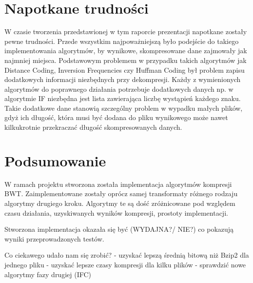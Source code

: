 
\section{Napotkane trudności}

W czasie tworzenia przedstawionej w tym raporcie prezentacji napotkane zostały pewne trudności. Przede wszystkim najpoważniejszą było podejście do takiego implementowania algorytmów, by wynikowe, skompresowane dane zajmowały jak najmniej miejsca. Podstawowym problemem w przypadku takich algorytmów jak Distance Coding, Inversion Frequencies czy Huffman Coding był problem zapisu dodatkowych informacji niezbędnych przy dekompresji. Każdy z wymienionych algorytmów do poprawnego działania potrzebuje dodatkowych danych np. w algorytmie IF niezbędna jest lista zawierająca liczbę wystąpień każdego znaku. Takie dodatkowe dane stanowią szczególny problem w wypadku małych plików, gdyż ich długość, która musi być dodana do pliku wynikowego może nawet kilkukrotnie przekraczać długość skompresowanych danych.

\section{Podsumowanie}

W ramach projektu stworzona została implementacja algorytmów kompresji BWT. Zaimplementowane zostały oprócz samej transformaty różnego rodzaju algorytmy drugiego kroku. Algorytmy te są dość zróżnicowane pod względem czasu działania, uzyskiwanych wyników kompresji, prostoty implementacji.

Stworzona implementacja okazała się być (WYDAJNA?/ NIE?) co pokazują wyniki przeprowadzonych testów.

Co ciekawego udało nam się zrobić?
	- uzyskać lepszą średnią bitową niż Bzip2 dla jednego pliku
	- uzyskać lepsze czasy kompresji dla kilku plików
	- sprawdzić nowe algorytmy fazy drugiej (IFC)

